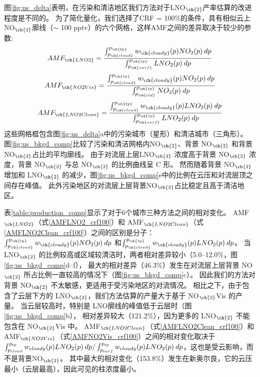 图\ref{fig:us_delta}表明，在污染和清洁地区我们方法对于LNO$_{\ch{2}}$产率估算的改进程度是不同的。
为了简化量化，我们选择了CRF = 100\%的条件，具有相似云上NO$_{\ch{2}}$廓线（$\sim$ 100 pptv）的六个网格，这样AMF之间的差异取决于较少的参数:
\begin{equation} \label{AMFLNO2_crf100}
AMF_{\ch{LNO2}} = \frac{\int_{p_{\ch{cloud}}}^{p_{\ch{tp}}} w_{\ch{cloudy}}(p) NO_2(p) \: dp}{\int_{p_{\ch{surf}}}^{p_{\ch{tp}}} LNO_2(p) \: dp}
\end{equation}
\begin{equation} \label{AMFNO2Vis_crf100}
AMF_{\ch{NO2Vis}} = \frac{\int_{p_{\ch{cloud}}}^{p_{\ch{tp}}} w_{\ch{cloudy}}(p) NO_2(p) \: dp}{\int_{p_{\ch{cld}}}^{p_{\ch{tp}}} NO_2(p) \: dp}
\end{equation}
\begin{equation} \label{AMFLNO2Clean_crf100}
AMF_{\ch{LNO2Clean}} = \frac{\int_{p_{\ch{cloud}}}^{p_{\ch{tp}}} w_{\ch{cloudy}}(p) LNO_2(p) \: dp}{\int_{p_{\ch{surf}}}^{p_{\ch{tp}}} LNO_2(p) \: dp}
\end{equation}
这些网格框包含图\ref{fig:us_delta}a中的污染城市（星形）和清洁城市（三角形）。
图\ref{fig:us_bkgd_comp}比较了污染和清洁网格内NO$_{\ch{2}}$、背景 NO$_{\ch{2}}$ 和背景 NO$_{\ch{2}}$占比的平均廓线。
由于对流层上层LNO$_{\ch{2}}$ 浓度高于背景 NO$_{\ch{2}}$ 浓度，背景 NO$_{\ch{2}}$ 与总 NO$_{\ch{2}}$ 的比例曲线呈 C 形。
然而随着背景 NO$_{\ch{2}}$ 增加和 LNO$_{\ch{2}}$ 的减少，图\ref{fig:us_bkgd_comp}e中的比例在云压和对流层顶之间存在峰值。
此外污染地区的对流层上层背景NO$_{\ch{2}}$占比稳定且高于清洁地区。

表\ref{table:production_comp}显示了对于6个城市三种方法之间的相对变化。
AMF$_{\ch{LNO2}}$（式\ref{AMFLNO2_crf100}）和 AMF$_{\ch{LNO2Clean}}$（式\ref{AMFLNO2Clean_crf100}）之间的区别是分子：
$\int_{p_{\ch{cloud}}}^{p_{\ch{tp}}} w_{\ch{cloudy}}(p) NO_2(p) \: dp$
和$\int_{p_{\ch{cloud}}}^{p_{\ch{tp}}} w_{\ch{cloudy}}(p) LNO_2(p) \: dp$。
当 LNO$_{\ch{2}}$ 的比例较高或区域较清洁时，两者相对差异较小（5.0--12.0\%，图\ref{fig:us_bkgd_comp}d--f），
最大的相对差异（46.3\%）发生在对流层上层背景 NO$_{\ch{2}}$ 所占比例一直较高的情况下（图\ref{fig:us_bkgd_comp}c）。
因此我们的方法对背景 NO$_{\ch{2}}$ 不太敏感，更适用于受污染地区的对流情况。
相比之下，由于包含了云层下方的 LNO$_{\ch{2}}$，我们方法估算的产量大于基于 NO$_{\ch{2}}$Vis 的产量。
当云层较高时，特别是 LNO廓线的峰值低于云层时（图\ref{fig:us_bkgd_comp}b），
相对差异较大（121.2\%），因为更多的 LNO$_{\ch{2}}$ 不能包含在 NO$_{\ch{2}}$Vis 中。
AMF$_{\ch{LNO2Clean}}$（式\ref{AMFLNO2Clean_crf100}）和 AMF$_{\ch{NO2Vis}}$（式\ref{AMFNO2Vis_crf100}）之间的相对变化取决于
$\int_{p_{\textrm cloud}}^{p_{\textrm tp}} w_{\textrm cloudy}(p) LNO_2(p) \: dp / \int_{p_{\textrm surf}}^{p_{\textrm tp}} w_{\textrm cloudy}(p) LNO_2(p) \: dp$，这也是受云影响，而不是背景NO$_{\ch{2}}$。
其中最大的相对变化（153.8\%）发生在新奥尔良，它的云压最小（云层最高），因此可见的柱浓度最小。

